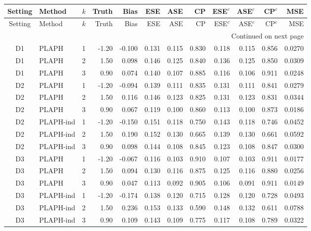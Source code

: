 \begin{longtable}{cllrrrrrrrrr}

\label{tab:e10-linear-censoring}\\
\toprule
Setting & Method & $k$ & Truth & Bias & ESE & ASE & CP & ESE$^{c}$ & ASE$^{c}$ & CP$^{c}$ & MSE \\
\midrule
\endfirsthead
\toprule
Setting & Method & $k$ & Truth & Bias & ESE & ASE & CP & ESE$^{c}$ & ASE$^{c}$ & CP$^{c}$ & MSE \\
\midrule
\endhead
\midrule
\multicolumn{12}{r}{Continued on next page} \\
\endfoot
\bottomrule
\endlastfoot
D1 & PLAPH & 1 & -1.20 & -0.100 & 0.131 & 0.115 & 0.830 & 0.118 & 0.115 & 0.856 & 0.0270 \\
D1 & PLAPH & 2 & 1.50 & 0.098 & 0.146 & 0.125 & 0.840 & 0.136 & 0.125 & 0.850 & 0.0309 \\
D1 & PLAPH & 3 & 0.90 & 0.074 & 0.140 & 0.107 & 0.885 & 0.116 & 0.106 & 0.911 & 0.0248 \\
D2 & PLAPH & 1 & -1.20 & -0.094 & 0.139 & 0.111 & 0.835 & 0.131 & 0.111 & 0.841 & 0.0279 \\
D2 & PLAPH & 2 & 1.50 & 0.116 & 0.146 & 0.123 & 0.825 & 0.131 & 0.123 & 0.831 & 0.0344 \\
D2 & PLAPH & 3 & 0.90 & 0.067 & 0.119 & 0.100 & 0.860 & 0.113 & 0.100 & 0.873 & 0.0186 \\
D2 & PLAPH-ind & 1 & -1.20 & -0.150 & 0.151 & 0.118 & 0.750 & 0.143 & 0.118 & 0.746 & 0.0452 \\
D2 & PLAPH-ind & 2 & 1.50 & 0.190 & 0.152 & 0.130 & 0.665 & 0.139 & 0.130 & 0.661 & 0.0592 \\
D2 & PLAPH-ind & 3 & 0.90 & 0.098 & 0.144 & 0.108 & 0.845 & 0.123 & 0.108 & 0.847 & 0.0300 \\
D3 & PLAPH & 1 & -1.20 & -0.067 & 0.116 & 0.103 & 0.910 & 0.107 & 0.103 & 0.911 & 0.0177 \\
D3 & PLAPH & 2 & 1.50 & 0.094 & 0.130 & 0.116 & 0.875 & 0.125 & 0.116 & 0.880 & 0.0256 \\
D3 & PLAPH & 3 & 0.90 & 0.047 & 0.113 & 0.092 & 0.905 & 0.106 & 0.091 & 0.911 & 0.0149 \\
D3 & PLAPH-ind & 1 & -1.20 & -0.174 & 0.138 & 0.120 & 0.715 & 0.128 & 0.120 & 0.728 & 0.0493 \\
D3 & PLAPH-ind & 2 & 1.50 & 0.236 & 0.153 & 0.133 & 0.590 & 0.148 & 0.132 & 0.611 & 0.0788 \\
D3 & PLAPH-ind & 3 & 0.90 & 0.109 & 0.143 & 0.109 & 0.775 & 0.117 & 0.108 & 0.789 & 0.0322 \\

\end{longtable}
